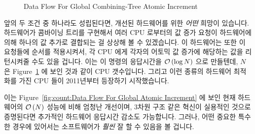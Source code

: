 {	\fi

\begin{figure}[tb]
\centering
{}
\caption{Data Flow For Global Combining-Tree Atomic Increment}
\label{fig:count:Data Flow For Global Combining-Tree Atomic Increment}
\end{figure}

	앞의 두 조건 중 하나라도 성립된다면, 개선된 하드웨어를 위한 \emph{어떤}
	희망이 있습니다.
	하드웨어가 콤바이닝 트리를 구현해서 여러 CPU 로부터의 값 증가 요청이
	하드웨어에 의해 하나의 값 추가로 결합되는 걸 상상해 볼 수 있겠습니다.
	이 하드웨어는 또한 이 요청들에 순서를 적용시켜서, 각 CPU 에게 각자의
	어토믹 값 증가에 해당하는 값을 리턴시켜줄 수도 있을 겁니다.
	이는 이 명령의 응답시간을 $\mathcal{O}\left(\log N\right)$ 으로 만들텐데, $N$ 은
	Figure~\ref{fig:count:Data Flow For Global Combining-Tree Atomic Increment}
	에 보인 것과 같이 CPU 갯수입니다.
	그리고 이런 종류의 하드웨어 최적화를 가진 CPU 들이 2011년부터 등장하기
	시작했습니다.

	이는
	Figure~\ref{fig:count:Data Flow For Global Atomic Increment}
	에 보인 현재 하드웨어의 $\mathcal{O}\left(N\right)$ 성능에 비해 엄청난 개선이며, 3차원 구조
	같은 혁신이 실용적인 것으로 증명된다면 추가적인 하드웨어 응답시간
	감소도 가능합니다.
	그러나, 어떤 중요한 특수한 경우에 있어서는 소프트웨어가 \emph{훨씬} 잘
	할 수 있음을 볼 겁니다.

}\QuickQuizEnd

